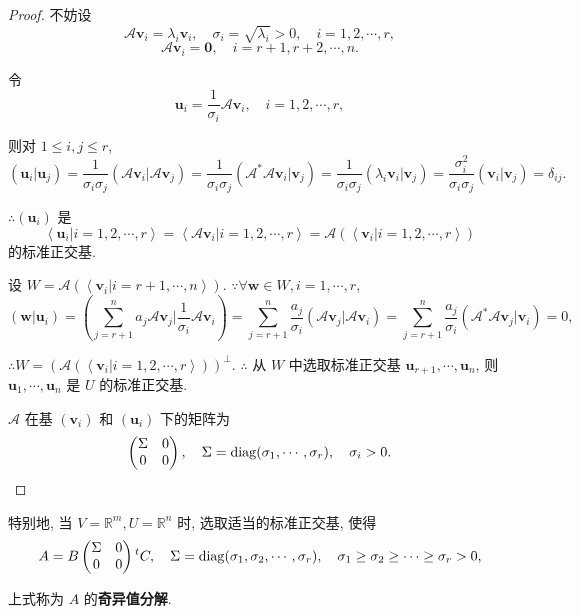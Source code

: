 \documentclass{ctexart}
\begin{document}
\begin{proof}
    不妨设
    \[\mathcal{A}\boldsymbol{v}_i=\lambda_i\boldsymbol{v}_i,\quad\sigma_i=\sqrt{\lambda_i}>0,\quad i=1,2,\cdots,r,\]
    \[\mathcal{A}\boldsymbol{v}_i=\boldsymbol{0},\quad i=r+1,r+2,\cdots,n.\]

    令
    \[\boldsymbol{u}_i=\dfrac{1}{\sigma_i}\mathcal{A}\boldsymbol{v}_i,\quad i=1,2,\cdots,r,\]

    则对 $1\leq i,j\leq r$,
    \[(\boldsymbol{u}_i|\boldsymbol{u}_j)=\dfrac{1}{\sigma_i\sigma_j}(\mathcal{A}\boldsymbol{v}_i|\mathcal{A}\boldsymbol{v}_j)=\dfrac{1}{\sigma_i\sigma_j}(\mathcal{A}^*\mathcal{A}\boldsymbol{v}_i|\boldsymbol{v}_j)=\dfrac{1}{\sigma_i\sigma_j}(\lambda_i\boldsymbol{v}_i|\boldsymbol{v}_j)=\dfrac{\sigma_i^2}{\sigma_i\sigma_j}(\boldsymbol{v}_i|\boldsymbol{v}_j)=\delta_{ij}.\]

    $\therefore(\boldsymbol{u}_i)$ 是
    \[\left<\boldsymbol{u}_i|i=1,2,\cdots,r\right>=\left<\mathcal{A}\boldsymbol{v}_i|i=1,2,\cdots,r\right>=\mathcal{A}(\left<\boldsymbol{v}_i|i=1,2,\cdots,r\right>)\]
    的标准正交基.

    设 $W=\mathcal{A}(\left<\boldsymbol{v}_i|i=r+1,\cdots,n\right>)$. $\because\forall\boldsymbol{w}\in W,i=1,\cdots,r$,
    \[(\boldsymbol{w}|\boldsymbol{u}_i)=\left(\sum\limits_{j=r+1}^na_j\mathcal{A}\boldsymbol{v}_j\Bigg|\dfrac{1}{\sigma_i}\mathcal{A}\boldsymbol{v}_i\right)=\sum\limits_{j=r+1}^n\dfrac{a_j}{\sigma_i}(\mathcal{A}\boldsymbol{v}_j|\mathcal{A}\boldsymbol{v}_i)=\sum\limits_{j=r+1}^n\dfrac{a_j}{\sigma_i}(\mathcal{A}^*\mathcal{A}\boldsymbol{v}_j|\boldsymbol{v}_i)=0,\]

    $\therefore W=(\mathcal{A}(\left<\boldsymbol{v}_i|i=1,2,\cdots,r\right>))^\perp$. $\therefore$ 从 $W$ 中选取标准正交基 $\boldsymbol{u}_{r+1},\cdots,\boldsymbol{u}_n$, 则 $\boldsymbol{u}_1,\cdots,\boldsymbol{u}_n$ 是 $U$ 的标准正交基.

    $\mathcal{A}$ 在基 $(\boldsymbol{v}_i)$ 和 $(\boldsymbol{u}_i)$ 下的矩阵为
    \[\begin{pmatrix}
        \Sigma & 0 \\
        0 & 0 \\
    \end{pmatrix},\quad\Sigma=\operatorname{diag} (\sigma_1,\cdots,\sigma_r),\quad\sigma_i>0.\qedhere\]
\end{proof}
\begin{note}
    特别地, 当 $V=\mathbb{R}^m,U=\mathbb{R}^n$ 时, 选取适当的标准正交基, 使得
    \[A=B\begin{pmatrix}
        \Sigma & 0 \\
        0 & 0 \\
    \end{pmatrix}{}^tC,\quad\Sigma=\operatorname{diag} (\sigma_1,\sigma_2,\cdots,\sigma_r),\quad \sigma_1\geq\sigma_2\geq\cdots\geq\sigma_r>0,\]

    上式称为 $A$ 的\textbf{奇异值分解}.
\end{note}
\end{document}
